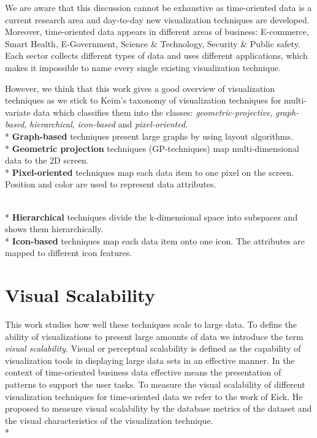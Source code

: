 We are aware that this discussion cannot be exhaustive as time-oriented data is a current research area and day-to-day new visualization techniques are developed.
Moreover, time-oriented data appears in different areas of business: E-commerce, Smart Health, E-Government, Science \& Technology, Security \& Public safety. Each sector collects different types of data and uses different applications, which makes it impossible to name every single existing visualization technique.


However, we think that this work gives a good overview of visualization techniques as we stick to Keim's taxonomy\cite{Keim1995} of visualization techniques for multi-variate data which classifies them into the classes: \textit{geometric-projective}, \textit{graph-based}, \textit{hierarchical}, \textit{icon-based} and \textit{pixel-oriented}.
\\*
\textbf{Graph-based} techniques present large graphs by using layout algorithms\cite{Keim1996}.
\\*
\textbf{Geometric projection} techniques (GP-techniques) map multi-dimensional data to the 2D screen\cite{FerreiradeOliveira2003}.
\\*
\textbf{Pixel-oriented} techniques map each data item to one pixel on the screen. Position and color are used to represent data attributes\cite{Keim1996}.



\\*
\textbf{Hierarchical} techniques divide the k-dimensional space into subspaces and shows them hierarchically. 
\\*
\textbf{Icon-based} techniques map each data item onto one icon. The attributes are mapped to different icon features\cite{Keim2001}.

\section{Visual Scalability}\label{scalability}

This work studies how well these techniques scale to large data. To define the ability of visualizations to present large amounts of data we introduce the term \textit{visual scalability}.
Visual or perceptual scalability is defined as the capability of visualization tools in displaying large data sets in an effective manner\cite{Eick2002}. In the context of time-oriented business data effective means the presentation of patterns to support the user tasks. To measure the visual scalability of different visualization techniques for time-oriented data we refer to the work of Eick\cite{Eick2002}. He proposed to measure visual scalability by the database metrics of the dataset and the visual characteristics of the visualization technique. \\*

